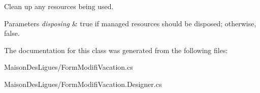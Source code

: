 Clean up any resources being used. 


\begin{DoxyParams}{Parameters}
{\em disposing} & true if managed resources should be disposed; otherwise, false.\\
\hline
\end{DoxyParams}


The documentation for this class was generated from the following files\+:\begin{DoxyCompactItemize}
\item 
Maison\+Des\+Ligues/Form\+Modifi\+Vacation.\+cs\item 
Maison\+Des\+Ligues/Form\+Modifi\+Vacation.\+Designer.\+cs\end{DoxyCompactItemize}

